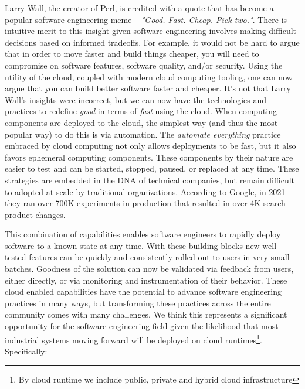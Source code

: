 \documentclass[conference]{IEEEtran}
\begin{document}
Larry Wall, the creator of Perl, is credited with a quote that has become a popular software engineering meme -- \textit{"Good. Fast. Cheap. Pick two."}.  There is intuitive merit to this insight given software engineering involves making difficult decisions based on informed tradeoffs.  For example, it would not be hard to argue that in order to move faster and build things cheaper, you will need to compromise on software features, software quality, and/or security. Using the utility of the cloud, coupled with modern cloud computing tooling, one can now argue that you can build better software faster and cheaper.  It's not that Larry Wall's insights were incorrect, but we can now have the technologies and practices to redefine \textit{good} in terms of \textit{fast} using the cloud.  When computing components are deployed to the cloud, the simplest way (and thus the most popular way) to do this is via automation\cite{terraform, AWSCloudFormation, AzureLaunch, Pulumi}.  The \textit{automate everything} practice embraced by cloud computing not only allows deployments to be fast, but it also favors ephemeral computing components. These components by their nature are easier to test\cite{kim2016devops} and can be started, stopped, paused, or replaced at any time. These strategies are embedded in the DNA of technical companies, but remain difficult to adopted at scale by traditional organizations. According to Google\cite{GoogleDevOps}, in 2021 they ran over 700K experiments in production that resulted in over 4K search product changes. 

This combination of capabilities enables software engineers to rapidly deploy software to a known state at any time. With these building blocks new well-tested features can be quickly and consistently rolled out to users in very small batches.  Goodness of the solution can now be validated via feedback from users, either directly, or via monitoring and instrumentation of their behavior.  These cloud enabled capabilities have the potential to advance software engineering practices in many ways, but transforming these practices across the entire community comes with many challenges. We think this represents a significant opportunity for the software engineering field given the likelihood that most industrial systems moving forward will be deployed on cloud runtimes\footnote{By cloud runtime we include public, private and hybrid cloud infrastructure}. Specifically:
\end{document}
